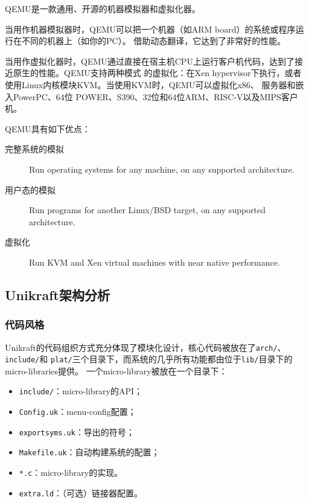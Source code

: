 \documentclass{../runikraft-report}
\begin{document}
QEMU是一款通用、开源的机器模拟器和虚拟化器。

当用作机器模拟器时，QEMU可以把一个机器（如ARM board）的系统或程序运行在不同的机器上（如你的PC）。
借助动态翻译，它达到了非常好的性能。

当用作虚拟化器时，QEMU通过直接在宿主机CPU上运行客户机代码，达到了接近原生的性能。QEMU支持两种模式
的虚拟化：在Xen hypervisor下执行，或者使用Linux内核模块KVM。当使用KVM时，QEMU可以虚拟化x86、
服务器和嵌入PowerPC、64位 POWER、S390、32位和64位ARM、RISC-V\cite{bib:qemu7}以及MIPS客户机。\cite{bib:feasibility-1}

\noindent QEMU具有如下优点：

\begin{description}
\item[完整系统的模拟] Run operating systems for any machine, on any supported architecture.
\item[用户态的模拟] Run programs for another Linux/BSD target, on any supported architecture.
\item[虚拟化] Run KVM and Xen virtual machines with near native performance.\cite{bib:feasibility-1}
\end{description}

\subsection{Unikraft架构分析}\vspace*{-4ex}
\subsubsection{代码风格}\label{ssubsec:code-style}
Unikraft的代码组织方式充分体现了模块化设计，核心代码被放在了\texttt{arch/}、\texttt{include/}和
\texttt{plat/}三个目录下，而系统的几乎所有功能都由位于\texttt{lib/}目录下的micro-libraries提供。
一个micro-library被放在一个目录下：
\begin{itemize}
\item \texttt{include/}：micro-library的API；
\item \texttt{Config.uk}：menu-config配置；
\item \texttt{exportsyms.uk}：导出的符号；
\item \texttt{Makefile.uk}：自动构建系统的配置；
\item \texttt{*.c}：micro-library的实现。
\item \texttt{extra.ld}：（可选）链接器配置。
\end{itemize}
\end{document}
